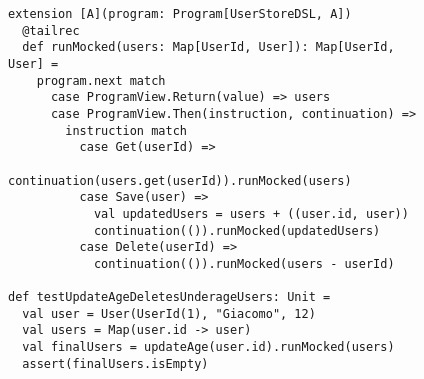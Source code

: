 \begin{figure}
  \begin{lstlisting}[language=scala3, label={lst:mock-free}, caption={Esempio di un interprete di test per un programma che usa lo il DSL per l'accesso a un database di utenti. In questo caso l'uso di una mappa degli utenti permette di testare semplicemente la logica applicativa delle operazioni senza dover ricorrere a un vero e proprio database}]
extension [A](program: Program[UserStoreDSL, A])
  @tailrec
  def runMocked(users: Map[UserId, User]): Map[UserId, User] =
    program.next match
      case ProgramView.Return(value) => users
      case ProgramView.Then(instruction, continuation) =>
        instruction match
          case Get(userId) =>
            continuation(users.get(userId)).runMocked(users)
          case Save(user) =>
            val updatedUsers = users + ((user.id, user))
            continuation(()).runMocked(updatedUsers)
          case Delete(userId) =>
            continuation(()).runMocked(users - userId)

def testUpdateAgeDeletesUnderageUsers: Unit =
  val user = User(UserId(1), "Giacomo", 12)
  val users = Map(user.id -> user)
  val finalUsers = updateAge(user.id).runMocked(users)
  assert(finalUsers.isEmpty)
  \end{lstlisting}
\end{figure}
